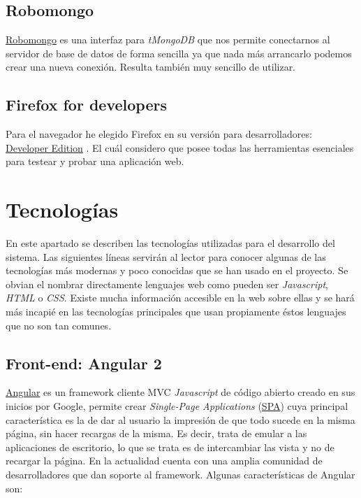 \subsection{Robomongo}\label{entorno-desarrollo}
\hyperlink{http://http//robomongo.org/}{Robomongo} es una interfaz para \emph{tMongoDB} que nos permite conectarnos al servidor de base de datos de forma sencilla ya que nada más arrancarlo podemos crear una nueva conexión. Resulta también muy sencillo de utilizar.


\subsection{Firefox for developers}\label{firefox}
Para el navegador he elegido Firefox en su versión para desarrolladores: \hyperlink{https://www.mozilla.org/es-ES/firefox/developer}{Developer Edition} . El cuál considero que posee todas las herramientas esenciales para testear y probar una aplicación web.





\section{Tecnologías}\label{tecnologias}
 En este apartado se describen las tecnologías utilizadas para el desarrollo del sistema. Las siguientes líneas servirán al lector para conocer algunas de las tecnologías más modernas y poco conocidas que se han usado en el proyecto. Se obvian el nombrar directamente lenguajes web como pueden ser \emph{Javascript}, \emph{HTML} o \emph{CSS}. Existe mucha información accesible en la web sobre ellas y se hará más incapié en las tecnologías principales que usan propiamente éstos lenguajes que no son tan comunes.
 
 \subsection{Front-end: Angular 2}\label{tecnologias-angular}
 \hyperlink{https://angular.io}{Angular} es un framework cliente MVC \emph{Javascript} de código abierto creado en sus inicios por Google, permite crear  \emph{Single-Page Applications} (\hyperlink{https://es.wikipedia.org/wiki/Single-page_application}{SPA})  cuya principal característica es la de dar al usuario la impresión de que todo sucede en la misma página, sin hacer recargas de la misma. Es decir, trata de emular a las aplicaciones de escritorio, lo que se trata es de intercambiar las vista y no de recargar la página. En la actualidad cuenta con una amplia comunidad de desarrolladores  que dan soporte al framework.  Algunas características de Angular son:
 
